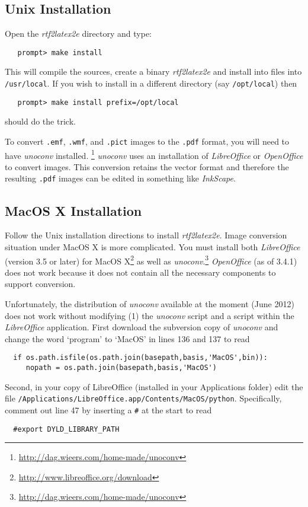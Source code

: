 \documentclass{article}
\begin{document}
\subsection{Unix Installation\label{Unix_install}}
Open the \textit{rtf2latex2e} directory and type:
\begin{verbatim}
   prompt> make install
\end{verbatim}
This will compile the sources, create a binary 
\textit{rtf2latex2e} and install into files into \texttt{/usr/local}.
If you wish to install in a different directory (say \texttt{/opt/local})
then 
\begin{verbatim}
   prompt> make install prefix=/opt/local
\end{verbatim}
should do the trick.

To convert \texttt{.emf}, \texttt{.wmf}, and \texttt{.pict} images to
the \texttt{.pdf} format, you will need to have \textit{unoconv} installed.%
\footnote{\url{http://dag.wieers.com/home-made/unoconv}}  \textit{unoconv} uses
an installation of \textit{LibreOffice} or \textit{OpenOffice} to convert images.
This conversion retains the vector format and therefore the resulting \texttt{.pdf}
images can be edited in something like \textit{InkScape}.

\subsection{MacOS X Installation}

Follow the Unix installation directions to install \textit{rtf2latex2e}.
Image conversion situation under MacOS X is more complicated.  You must install both \textit{LibreOffice} (version 3.5 or later) for MacOS X\footnote{\url{http://www.libreoffice.org/download}}
as well as \textit{unoconv}.\footnote{\url{http://dag.wieers.com/home-made/unoconv}}
\textit{OpenOffice} (as of 3.4.1) does not work because it
does not contain all the necessary components to support conversion.

Unfortunately, the distribution of \textit{unoconv} available
at the moment (June 2012) does not work without modifying (1) the \textit{unoconv} script and a script within the \textit{LibreOffice} application. 
First download the subversion copy of \textit{unoconv} and change the word `program' to `MacOS' in lines 136 and 137 to read
\begin{verbatim}
  if os.path.isfile(os.path.join(basepath,basis,'MacOS',bin)):
     nopath = os.path.join(basepath,basis,'MacOS')
\end{verbatim}
Second, in your copy of LibreOffice (installed in your Applications folder) 
edit the file
\texttt{/Applications/LibreOffice.app/Contents/MacOS/python}.
Specifically, comment out line 47 by inserting a \texttt{\#} at the start to read
\begin{verbatim}
  #export DYLD_LIBRARY_PATH
\end{verbatim}
\end{document}
